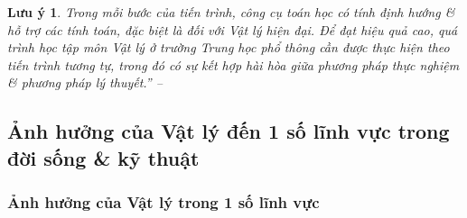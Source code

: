 \documentclass[oneside]{book}
\numberwithin{equation}{section}
\newtheorem{luuy}{Lưu ý}[section]
\begin{document}
\begin{luuy}
	Trong mỗi bước của tiến trình, công cụ toán học có tính định hướng \& hỗ trợ các tính toán, đặc biệt là đối với Vật lý hiện đại. Để đạt hiệu quả cao, quá trình học tập môn Vật lý ở trường Trung học phổ thông cần được thực hiện theo tiến trình tương tự, trong đó có sự kết hợp hài hòa giữa phương pháp thực nghiệm \& phương pháp lý thuyết.'' -- \cite[p. 9]{SGK_Vat_Ly_10_Chan_Troi_Sang_Tao}
\end{luuy}

\subsection{Ảnh hưởng của Vật lý đến 1 số lĩnh vực trong đời sống \& kỹ thuật}

\subsubsection{Ảnh hưởng của Vật lý trong 1 số lĩnh vực}
\end{document}
